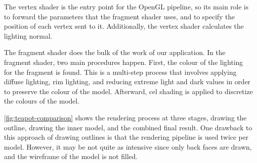 The vertex shader is the entry point for the OpenGL pipeline, so its main role is to forward the 
parameters that the fragment shader uses, and to specify the position of each vertex sent to it. 
Additionally, the vertex shader calculates the lighting normal.

The fragment shader does the bulk of the work of our application. In the fragment shader, two main
procedures happen. First, the colour of the lighting for the fragment is found. This is a multi-step
process that involves applying diffuse lighting, rim lighting, and reducing extreme light and dark 
values in order to preserve the colour of the model. Afterward, cel shading is applied to discretize
the colours of the model. 

\autoref{fig:teapot-comparison} shows the rendering process at three stages, drawing the outline,
drawing the inner model, and the combined final result. One drawback to this approach of drawing
outlines is that the rendering pipeline is used twice per model. However, it may be not quite as 
intensive since only back faces are drawn, and the wireframe of the model is not filled.

